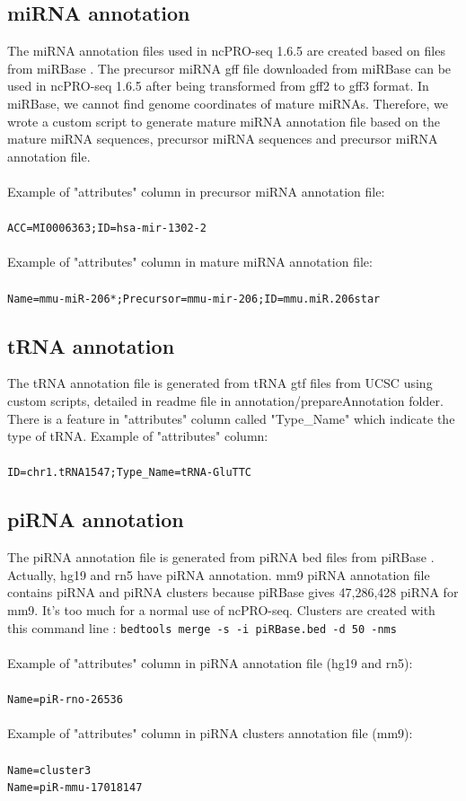 \documentclass[12pt]{article}
\def \ncpip{ncPRO-seq 1.6.5}
\begin{document}
\subsection{miRNA annotation}
\label{subsection:mirna}
The miRNA annotation files used in \ncpip{} are created based on files from miRBase \cite{Kozomara2011}. The precursor miRNA gff file downloaded from miRBase can be used in \ncpip{} after being transformed from gff2 to gff3 format. In miRBase, we cannot find genome coordinates of mature miRNAs. Therefore, we wrote a custom script to generate mature miRNA annotation file based on the mature miRNA sequences, precursor miRNA sequences and precursor miRNA annotation file. \\\\
Example of "attributes" column in precursor miRNA annotation file:\\\\
\verb|ACC=MI0006363;ID=hsa-mir-1302-2|\\\\
Example of "attributes" column in mature miRNA annotation file:\\\\
\verb|Name=mmu-miR-206*;Precursor=mmu-mir-206;ID=mmu.miR.206star|

\subsection{tRNA annotation}
\label{subsection:trna}
The tRNA annotation file is generated from tRNA gtf files from UCSC \cite{Dreszer2012} using custom scripts, detailed in readme file in annotation/prepareAnnotation folder. There is a feature in "attributes" column called "Type\_Name" which indicate the type of tRNA. Example of "attributes" column: \\\\
\verb|ID=chr1.tRNA1547;Type_Name=tRNA-GluTTC|

\subsection{piRNA annotation}
\label{subsection:pirna}
The piRNA annotation file is generated from piRNA bed files from piRBase \cite{Zhang2014}. Actually, hg19 and rn5 have piRNA annotation. mm9 piRNA annotation file contains piRNA and piRNA clusters because piRBase gives 47,286,428 piRNA for mm9. It's too much for a normal use of ncPRO-seq. Clusters are created with this command line : \verb|bedtools merge -s -i piRBase.bed -d 50 -nms|\\\\
Example of "attributes" column in piRNA annotation file (hg19 and rn5):\\\\
\verb|Name=piR-rno-26536|\\\\
Example of "attributes" column in piRNA clusters annotation file (mm9):\\\\
\verb|Name=cluster3|\\
\verb|Name=piR-mmu-17018147|
\end{document}
